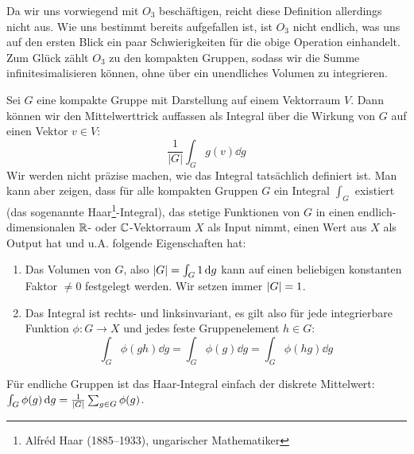 Da wir uns vorwiegend mit $O_3$ beschäftigen, reicht diese Definition allerdings nicht aus. Wie uns bestimmt bereits aufgefallen ist, ist $O_3$ nicht endlich, was uns auf den ersten Blick ein paar Schwierigkeiten für die obige Operation einhandelt. Zum Glück zählt $O_3$ zu den kompakten Gruppen, sodass wir die Summe infinitesimalisieren können, ohne über ein unendliches Volumen zu integrieren.
\begin{definition}
	Sei $G$ eine kompakte Gruppe mit Darstellung auf einem Vektorraum $V$. Dann können wir den Mittelwerttrick auffassen als Integral über die Wirkung von $G$ auf einen Vektor $v\in V$:
	\[
		\frac{1}{|G|} \int_{G} g(v) \dd g
	\]
	Wir werden nicht präzise machen, wie das Integral tatsächlich definiert ist. Man kann aber zeigen, dass für alle kompakten Gruppen $G$ ein Integral $\int_G$ existiert (das sogenannte Haar\footnote{Alfréd Haar (1885--1933), ungarischer Mathematiker}-Integral), das stetige Funktionen von $G$ in einen endlich-dimensionalen $\mathbb{R}$- oder $\mathbb{C}$-Vektorraum $X$ als Input nimmt, einen Wert aus $X$ als Output hat und u.A. folgende Eigenschaften hat: 
	\begin{enumerate}
		\item Das Volumen von $G$, also $\lvert G\rvert = \int_G 1 \,\textrm{d} g$ kann auf einen beliebigen konstanten Faktor $\neq0$ festgelegt werden. Wir setzen immer $\lvert G\rvert=1$.
		\item Das Integral ist rechts- und linksinvariant, es gilt also für jede integrierbare Funktion $\phi: G\to X$ und jedes feste Gruppenelement $h\in G$:
			\[
			\int_{G} \phi(gh) \dd g = \int_{G} \phi(g) \dd g  = \int_{G} \phi(hg) \dd g 
			\]
	\end{enumerate}
	Für endliche Gruppen ist das Haar-Integral einfach der diskrete Mittelwert: $\int_G \phi(g) \,\textrm{d} g = \frac{1}{\lvert G\rvert} \sum_{g\in G} \phi(g)$.
\end{definition}

